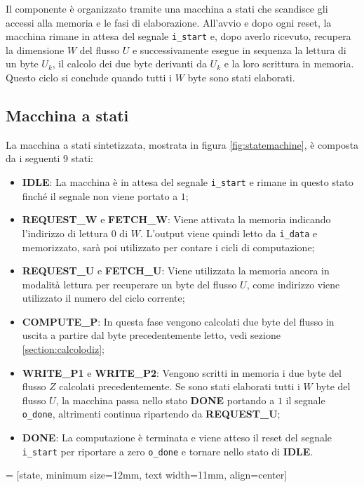 Il componente è organizzato tramite una macchina a stati che scandisce gli accessi alla memoria e le fasi di elaborazione. All'avvio e dopo ogni reset, la macchina rimane in attesa del segnale \verb|i_start| e, dopo averlo ricevuto, recupera la dimensione $W$ del flusso $U$ e successivamente esegue in sequenza la lettura di un byte $U_k$, il calcolo dei due byte derivanti da $U_k$ e la loro scrittura in memoria. Questo ciclo si conclude quando tutti i $W$ byte sono stati elaborati.

\subsection{Macchina a stati}

La macchina a stati sintetizzata, mostrata in figura \ref{fig:statemachine}, è composta da i seguenti 9 stati:

\begin{itemize}
    \item \textbf{IDLE}: La macchina è in attesa del segnale \verb|i_start| e rimane in questo stato finché il segnale non viene portato a $1$;
    \item \textbf{REQUEST\_W} e \textbf{FETCH\_W}: Viene attivata la memoria indicando l'indirizzo di lettura $0$ di $W$. L'output viene quindi letto da \verb|i_data| e memorizzato, sarà poi utilizzato per contare i cicli di computazione;
    \item \textbf{REQUEST\_U} e \textbf{FETCH\_U}: Viene utilizzata la memoria ancora in modalità lettura per recuperare un byte del flusso $U$, come indirizzo viene utilizzato il numero del ciclo corrente;
    \item \textbf{COMPUTE\_P}: In questa fase vengono calcolati due byte del flusso in uscita a partire dal byte precedentemente letto, vedi sezione \ref{section:calcolodiz};
    \item \textbf{WRITE\_P1} e \textbf{WRITE\_P2}: Vengono scritti in memoria i due byte del flusso $Z$ calcolati precedentemente. Se sono stati elaborati tutti i $W$ byte del flusso $U$, la macchina passa nello stato \textbf{DONE} portando a $1$ il segnale \verb|o_done|, altrimenti continua ripartendo da \textbf{REQUEST\_U};
    \item \textbf{DONE}: La computazione è terminata e viene atteso il reset del segnale \verb|i_start| per riportare a zero \verb|o_done| e tornare nello stato di \textbf{IDLE}.
\end{itemize}

 = [state, minimum size=12mm, text width=11mm, align=center]


